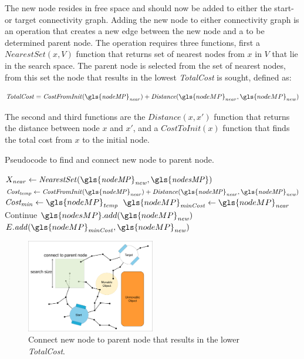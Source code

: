 The new node resides in free space and should now be added to either the start- or target connectivity graph. Adding the new node to either connectivity graph is an operation that creates a new edge between the new node and a to be determined parent node. The operation requires three functions, first a $\mathit{NearestSet}(x, V)$ function that returns set of nearest nodes from $x$ in $V$ that lie in the search space. The parent node is selected from the set of nearest nodes, from this set the node that results in the lowest \textit{TotalCost} is sought, defined as:\bs

\[\mathit{TotalCost} = \mathit{CostFromInit(\gls{nodeMP}_{near})} + \mathit{Distance}(\gls{nodeMP}_{near}, \gls{nodeMP}_{new})\]

The second and third functions are the $\mathit{Distance}(x, x')$ function that returns the distance between node $x$ and $x'$, and a $\mathit{CostToInit}(x)$ function that finds the total cost from $x$ to the initial node.\bs

\begin{algorithm}[H]
\caption{Pseudocode to find and connect new node to parent node.}%
\label{pseudocode:proposed_rrt_star_two}
\begin{algorithmic}[1]
\hspace{-0.9cm}\colorbox{my_yellow}{\parbox{\linewidth}{%
    \State $X_\mathit{near} \leftarrow \mathit{NearestSet(\gls{nodeMP}_{new}, \gls{nodesMP})}$
    \State $\mathit{Cost_{temp}} \leftarrow \mathit{CostFromInit(\gls{nodeMP}_{near}) + Distance(\gls{nodeMP}_{near}, \gls{nodeMP}_{new})}$
    \State $\mathit{Cost_{min}} \leftarrow \gls{nodeMP}_\mathit{temp}$
    \State $\gls{nodeMP}_\mathit{minCost} \leftarrow \gls{nodeMP}_\mathit{near}$
        \EndIf
    \EndFor
        \State Continue
    \Else
    \State $\gls{nodesMP}.add(\gls{nodeMP}_\mathit{new})$
    \State $E.\mathit{add}(\gls{nodeMP}_\mathit{minCost}, \gls{nodeMP}_\mathit{new})$
    \EndIf
}}
\end{algorithmic}
\end{algorithm}

\begin{figure}[H]
    \centering
    \includegraphics[width=0.5\textwidth, cfbox=my_yellow 5pt 0pt]{figures/required_background/mp/4mp_connect_to_tree.drawio.png}
    \caption{Connect new node to parent node that results in the lower \textit{TotalCost}.}%
    \label{fig:motion_planner_adding_one_node_two}
\end{figure}

